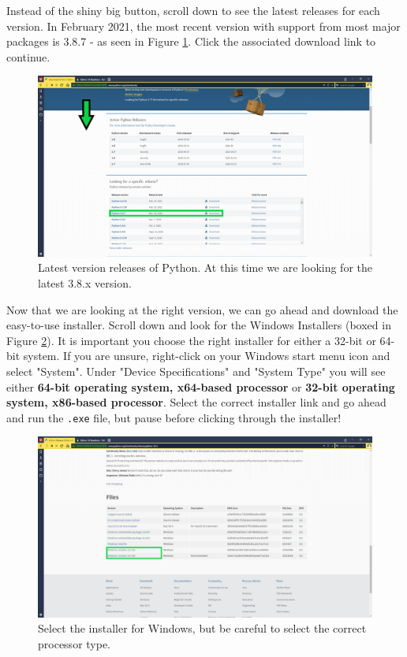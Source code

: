 \documentclass[oneside]{book}
\begin{document}
Instead of the shiny big button, scroll down to see the latest releases for each version. In February 2021, the most recent version with support from most major packages is 3.8.7 - as seen in Figure \ref{fig:pyDownloadVersions}. Click the associated download link to continue.

\begin{figure}[H]
\centering
\includegraphics[width=0.7\linewidth]{./img/pyDownloadVersion.PNG}
\caption{Latest version releases of Python. At this time we are looking for the latest 3.8.x version.}
\label{fig:pyDownloadVersions}
\end{figure}

Now that we are looking at the right version, we can go ahead and download the easy-to-use installer. Scroll down and look for the Windows Installers (boxed in Figure \ref{fig:pyInstallSelect}). It is important you choose the right installer for either a 32-bit or 64-bit system. If you are unsure, right-click on your Windows start menu icon and select "System". Under "Device Specifications" and "System Type" you will see either \textbf{64-bit operating system, x64-based processor} or \textbf{32-bit operating system, x86-based processor}. Select the correct installer link and go ahead and run the \texttt{.exe} file, but pause before clicking through the installer!

\begin{figure}[H]
\centering
\includegraphics[width=0.7\linewidth]{./img/pyDownloadOS.PNG}
\caption{Select the installer for Windows, but be careful to select the correct processor type.}
\label{fig:pyInstallSelect}
\end{figure}
\end{document}
